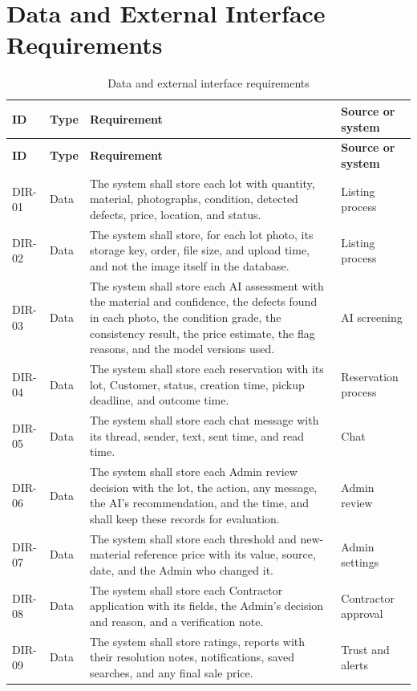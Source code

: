 \section{Data and External Interface Requirements }
{\footnotesize
\begin{longtable}{@{}p{}p{}p{}p{}@{}}
\caption{Data and external interface requirements}\label{tab:data-interface-requirements}\\
\toprule
\textbf{ID} & \textbf{Type} & \textbf{Requirement} & \textbf{Source or system} \\
\midrule
\endfirsthead
\toprule
\textbf{ID} & \textbf{Type} & \textbf{Requirement} & \textbf{Source or system} \\
\midrule
\endhead
DIR-01 & Data & The system shall store each lot with quantity, material, photographs, condition, detected defects, price, location, and status. & Listing process \\
DIR-02 & Data & The system shall store, for each lot photo, its storage key, order, file size, and upload time, and not the image itself in the database. & Listing process \\
DIR-03 & Data & The system shall store each AI assessment with the material and confidence, the defects found in each photo, the condition grade, the consistency result, the price estimate, the flag reasons, and the model versions used. & AI screening \\
DIR-04 & Data & The system shall store each reservation with its lot, Customer, status, creation time, pickup deadline, and outcome time. & Reservation process \\
DIR-05 & Data & The system shall store each chat message with its thread, sender, text, sent time, and read time. & Chat \\
DIR-06 & Data & The system shall store each Admin review decision with the lot, the action, any message, the AI's recommendation, and the time, and shall keep these records for evaluation. & Admin review \\
DIR-07 & Data & The system shall store each threshold and new-material reference price with its value, source, date, and the Admin who changed it. & Admin settings \\
DIR-08 & Data & The system shall store each Contractor application with its fields, the Admin's decision and reason, and a verification note. & Contractor approval \\
DIR-09 & Data & The system shall store ratings, reports with their resolution notes, notifications, saved searches, and any final sale price. & Trust and alerts \\

\end{longtable}}
